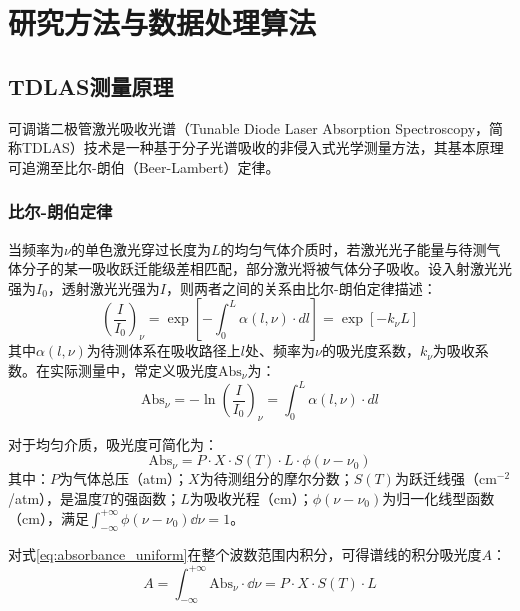 
\chapter{研究方法与数据处理算法}


\section{TDLAS测量原理}

可调谐二极管激光吸收光谱（Tunable Diode Laser Absorption Spectroscopy，简称TDLAS）技术是一种基于分子光谱吸收的非侵入式光学测量方法，其基本原理可追溯至比尔-朗伯（Beer-Lambert）定律。

\subsection{比尔-朗伯定律}

当频率为$\nu$的单色激光穿过长度为$L$的均匀气体介质时，若激光光子能量与待测气体分子的某一吸收跃迁能级差相匹配，部分激光将被气体分子吸收。设入射激光光强为$I_0$，透射激光光强为$I$，则两者之间的关系由比尔-朗伯定律描述：
\begin{equation}
	\left(\frac{I}{I_0}\right)_\nu = \exp\left[-\int_0^L \alpha(l,\nu) \cdot dl\right] = \exp[-k_\nu L]
	\label{eq:beer_lambert}
\end{equation}
其中$\alpha(l,\nu)$为待测体系在吸收路径上$l$处、频率为$\nu$的吸光度系数，$k_\nu$为吸收系数。在实际测量中，常定义吸光度$\text{Abs}_\nu$为：
\begin{equation}
	\text{Abs}_\nu = -\ln\left(\frac{I}{I_0}\right)_\nu = \int_0^L \alpha(l,\nu) \cdot dl
	\label{eq:absorbance}
\end{equation}

对于均匀介质，吸光度可简化为：
\begin{equation}
	\text{Abs}_\nu = P \cdot X \cdot S(T) \cdot L \cdot \phi(\nu - \nu_0)
	\label{eq:absorbance_uniform}
\end{equation}
其中：$P$为气体总压（atm）；$X$为待测组分的摩尔分数；$S(T)$为跃迁线强（cm$^{-2}$/atm），是温度$T$的强函数；$L$为吸收光程（cm）；$\phi(\nu - \nu_0)$为归一化线型函数（cm），满足$\int_{-\infty}^{+\infty} \phi(\nu - \nu_0) \dd\nu = 1$。

对式\eqref{eq:absorbance_uniform}在整个波数范围内积分，可得谱线的积分吸光度$A$：
\begin{equation}
	A = \int_{-\infty}^{+\infty} \text{Abs}_\nu \cdot \dd\nu = P \cdot X \cdot S(T) \cdot L
	\label{eq:integrated_absorbance}
\end{equation}

